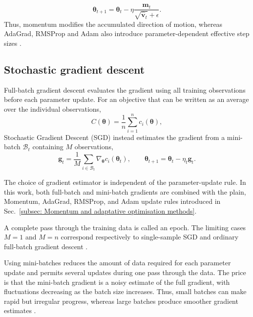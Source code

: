 \documentclass[aps,rmp,reprint,amsmath,amssymb,graphicx,longbibliography]{revtex4-1}
\begin{document}
\begin{equation}
    \boldsymbol{\theta}_{t+1}
    =
    \boldsymbol{\theta}_t
    -
    \eta
    \frac{\hat{\mathbf{m}}_t}
         {\sqrt{\hat{\mathbf{v}}_t}+\epsilon}.
\end{equation}
Thus, momentum modifies the accumulated
direction of motion, whereas AdaGrad, RMSProp and Adam also introduce
parameter-dependent effective step sizes \cite{HjorthJensen2026MLPSCh4}. 

\subsection{Stochastic gradient descent}

Full-batch gradient descent evaluates the gradient using all training
observations before each parameter update. For an objective that can be
written as an average over the individual observations,
\begin{equation}
    C(\boldsymbol{\theta})
    =
    \frac{1}{n}
    \sum_{i=1}^{n}
    c_i(\boldsymbol{\theta}),
\end{equation}
Stochastic Gradient Descent (SGD) instead estimates the gradient from a
mini-batch $\mathcal{B}_t$ containing $M$ observations,
\begin{equation}
    \mathbf{g}_t
    =
    \frac{1}{M}
    \sum_{i\in\mathcal{B}_t}
    \nabla_{\boldsymbol{\theta}}
    c_i(\boldsymbol{\theta}_t),
    \qquad
    \boldsymbol{\theta}_{t+1}
    =
    \boldsymbol{\theta}_t-\eta_t\mathbf{g}_t .
\end{equation}

The choice of gradient estimator is independent of the parameter-update
rule. In this work, both full-batch and mini-batch gradients are combined
with the plain, Momentum, AdaGrad, RMSProp, and Adam update rules introduced
in Sec.~\ref{subsec: Momentum and adaptative optimisation methods}. 

A complete pass through the training data is called an epoch. The limiting
cases $M=1$ and $M=n$ correspond respectively to single-sample SGD and
ordinary full-batch gradient descent \cite{HjorthJensen2026MLPSCh4}.

Using mini-batches reduces the amount of data required for each parameter
update and permits several updates during one pass through the data. The
price is that the mini-batch gradient is a noisy estimate of the full
gradient, with fluctuations decreasing as the batch size increases. Thus,
small batches can make rapid but irregular progress, whereas large batches
produce smoother gradient estimates \cite{HjorthJensen2026MLPSCh4}.
\end{document}
